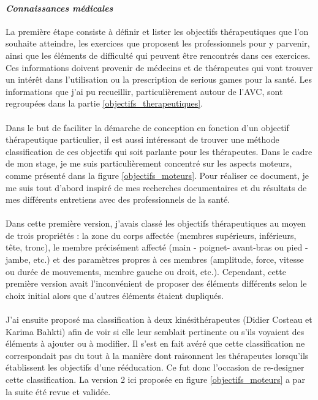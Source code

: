 			\paragraph{\emph{Connaissances médicales}\\}
La première étape consiste à définir et lister les objectifs thérapeutiques que l’on souhaite atteindre, les exercices que proposent les professionnels pour y parvenir, ainsi que les éléments de difficulté qui peuvent être rencontrés dans ces exercices. Ces informations doivent provenir de médecins et de thérapeutes qui vont trouver un intérêt dans l’utilisation ou la prescription de serious games pour la santé. Les informations que j'ai pu recueillir, particulièrement autour de l'AVC, sont regroupées dans la partie \ref{objectifs_therapeutiques}.

\paragraph{}
Dans le but de faciliter la démarche de conception en fonction d’un objectif thérapeutique particulier, il est aussi intéressant de trouver une méthode classification de ces objectifs qui soit parlante pour les thérapeutes. Dans le cadre de mon stage, je me suis particulièrement concentré sur les aspects moteurs, comme présenté dans la figure \ref{objectifs_moteurs}. Pour réaliser ce document, je me suis tout d'abord inspiré de mes recherches documentaires et du résultats de mes différents entretiens avec des professionnels de la santé.

\paragraph{}
Dans cette première version, j'avais classé les objectifs thérapeutiques au moyen de trois propriétés : la zone du corps affectée (membres supérieurs, inférieurs, tête, tronc), le membre précisément affecté (main - poignet- avant-bras ou pied - jambe, etc.) et des paramètres propres à ces membres (amplitude, force, vitesse ou durée de mouvements, membre gauche ou droit, etc.). Cependant, cette première version avait l'inconvénient de proposer des éléments différents selon le choix initial alors que d'autres éléments étaient dupliqués.

\paragraph{}J'ai ensuite proposé ma classification à deux kinésithérapeutes (Didier Costeau et Karima Bahkti) afin de voir si elle leur semblait pertinente ou s'ils voyaient des éléments à ajouter ou à modifier. Il s'est en fait avéré que cette classification ne correspondait pas du tout à la manière dont raisonnent les thérapeutes lorsqu'ils établissent les objectifs d'une rééducation. Ce fut donc l'occasion de re-designer cette classification. La version 2 ici proposée en figure \ref{objectifs_moteurs} a par la suite été revue et validée.

